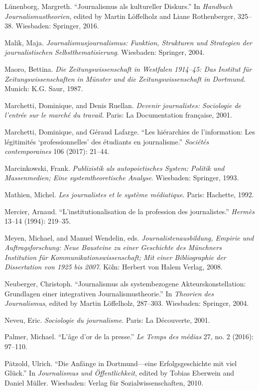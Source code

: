\documentclass{tufte-handout}
\begin{document}
\begin{hangparas}{.25in}{1}
Lünenborg, Margreth. ``Journalismus als kultureller Diskurs.'' In
\emph{Handbuch Journalismustheorien}, edited by Martin Löffelholz and
Liane Rothenberger, 325--38. Wiesbaden: Springer, 2016.

Malik, Maja. \emph{Journalismusjournalismus: Funktion, Strukturen und
Strategien der journalistischen Selbstthematisierung}. Wiesbaden:
Springer, 2004.

Maoro, Bettina. \emph{Die Zeitungswissenschaft in Westfalen 1914--45:
Das Institut für Zeitungswissenschaften in Münster und die
Zeitungswissenschaft in Dortmund}. Munich: K.G. Saur, 1987.

Marchetti, Dominique, and Denis Ruellan. \emph{Devenir journalistes:
Sociologie de l'entrée sur le marché du travail.} Paris: La
Documentation française, 2001.

Marchetti, Dominique, and Géraud Lafarge. ``Les hiérarchies de
l'information: Les légitimités `professionnelles' des étudiants en
journalisme.'' \emph{Sociétés contemporaines} 106 (2017): 21--44.

Marcinkowski, Frank. \emph{Publizistik als autopoietisches System:
Politik und Massenmedien; Eine systemtheoretische Analyse}. Wiesbaden:
Springer, 1993.

Mathien, Michel. \emph{Les journalistes et le système médiatique}.
Paris: Hachette, 1992.

Mercier, Arnaud. ``L'institutionalisation de la profession des
journalistes.'' \emph{Hermès} 13--14 (1994): 219--35.

Meyen, Michael, and Manuel Wendelin, eds. \emph{Journalistenausbildung,
Empirie und Auftragsforschung: Neue Bausteine zu einer Geschichte des
Münchners Institution für Kommunikationswissenschaft; Mit einer
Bibliographie der Dissertation von 1925 bis 2007}. Köln: Herbert von
Halem Verlag, 2008.

Neuberger, Christoph. ``Journalismus als systembezogene
Akteurskonstellation: Grundlagen einer integrativen
Journalismustheorie.'' In \emph{Theorien des Journalismus}, edited by
Martin Löffelholz, 287--303. Wiesbaden: Springer, 2004.

Neveu, Eric. \emph{Sociologie du journalisme}. Paris: La Découverte,
2001.

Palmer, Michael. ``L'âge d'or de la presse.'' \emph{Le Temps des médias}
27, no. 2 (2016): 97--110.

Pätzold, Ulrich. ``Die Anfänge in Dortmund---eine Erfolgsgeschichte mit
viel Glück.'' In \emph{Journalismus und Öffentlichkeit}, edited by
Tobias Eberwein and Daniel Müller. Wiesbaden: Verlag für
Sozialwissenschaften, 2010.


\end{hangparas}
\end{document}
